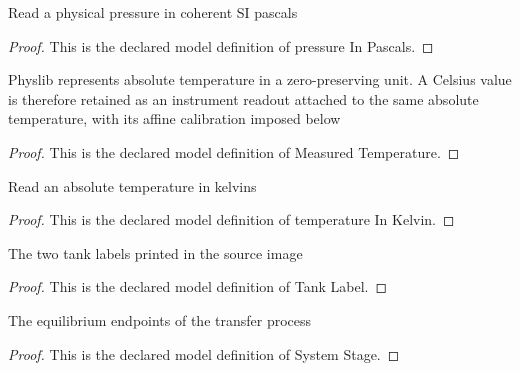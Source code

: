 \begin{definition}
  \label{def:physics:phyx-mini-0444:phyxminiproblems-problemphyxmini0444-pressureinpascals}
  Read a physical pressure in coherent SI pascals
\end{definition}
\begin{proof}
  This is the declared model definition of pressure In Pascals.
\end{proof}
\begin{definition}
  \label{def:physics:phyx-mini-0444:phyxminiproblems-problemphyxmini0444-measuredtemperature}
  Physlib represents absolute temperature in a zero-preserving unit. A Celsius value is therefore retained as an instrument readout attached to the same absolute temperature, with its affine calibration imposed below
\end{definition}
\begin{proof}
  This is the declared model definition of Measured Temperature.
\end{proof}
\begin{definition}
  \label{def:physics:phyx-mini-0444:phyxminiproblems-problemphyxmini0444-temperatureinkelvin}
  Read an absolute temperature in kelvins
\end{definition}
\begin{proof}
  This is the declared model definition of temperature In Kelvin.
\end{proof}
\begin{definition}
  \label{def:physics:phyx-mini-0444:phyxminiproblems-problemphyxmini0444-tanklabel}
  The two tank labels printed in the source image
\end{definition}
\begin{proof}
  This is the declared model definition of Tank Label.
\end{proof}
\begin{definition}
  \label{def:physics:phyx-mini-0444:phyxminiproblems-problemphyxmini0444-systemstage}
  The equilibrium endpoints of the transfer process
\end{definition}
\begin{proof}
  This is the declared model definition of System Stage.
\end{proof}
